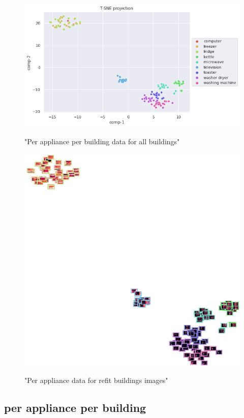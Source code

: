 \begin{figure}[H]
	\centering
	\caption{"Per appliance per building data for all buildings"}
	\includegraphics[width=1.2\textwidth]{Figures/TSNE/TSNE_results/refit/scatter_refit_8.png}
	\label{fig:tsne_papb_scatter_ent_refit8}
\end{figure}

\begin{figure}[H]
	\centering
	\caption{"Per appliance data for refit buildings images"}
	\includegraphics[width=.9\textwidth]{Figures/TSNE/TSNE_results/refit/img_scatter_refit8.png}
	\label{fig:tsne_papb_img_scatter_ent_refit8}
\end{figure}


\subsection{per appliance per building}
